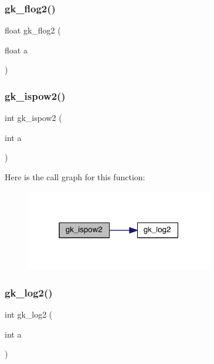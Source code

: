 \subsubsection{\texorpdfstring{gk\+\_\+flog2()}{gk\_flog2()}}
{\footnotesize\ttfamily float gk\+\_\+flog2 (\begin{DoxyParamCaption}\item[{float}]{a }\end{DoxyParamCaption})}

\mbox{\label{a00867_a3c34c6c0ef65d5d47a8daed527cf6a43}} 
\subsubsection{\texorpdfstring{gk\+\_\+ispow2()}{gk\_ispow2()}}
{\footnotesize\ttfamily int gk\+\_\+ispow2 (\begin{DoxyParamCaption}\item[{int}]{a }\end{DoxyParamCaption})}

Here is the call graph for this function\+:\nopagebreak
\begin{figure}[H]
\begin{center}
\leavevmode
\includegraphics[width=232pt]{a00867_a3c34c6c0ef65d5d47a8daed527cf6a43_cgraph}
\end{center}
\end{figure}
\mbox{\label{a00867_abd15453cc17729704313317fd612fc6b}} 
\subsubsection{\texorpdfstring{gk\+\_\+log2()}{gk\_log2()}}
{\footnotesize\ttfamily int gk\+\_\+log2 (\begin{DoxyParamCaption}\item[{int}]{a }\end{DoxyParamCaption})}


